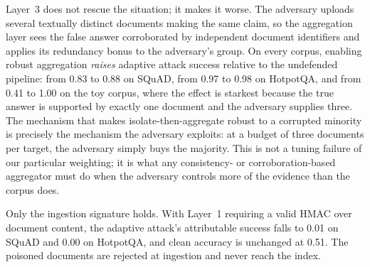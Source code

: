 \documentclass[information,article,submit,moreauthors]{Definitions/mdpi}
\newcommand{\casrAdaptiveHotpotqanone}{0.97}
\newcommand{\casrAdaptiveHotpotqaLThree}{0.98}
\newcommand{\casrAdaptiveHotpotqafullsigned}{0.00}
\newcommand{\casrAdaptiveToynone}{0.41}
\newcommand{\casrAdaptiveToyLThree}{1.00}
\newcommand{\casrAdaptiveSquadnone}{0.83}
\newcommand{\casrAdaptiveSquadLThree}{0.88}
\newcommand{\casrAdaptiveSquadfullsigned}{0.01}
\newcommand{\cleanAccSquadfullsigned}{0.51}
\begin{document}
Layer~3 does not rescue the situation; it makes it worse. The adversary uploads several
textually distinct documents making the same claim, so the aggregation layer sees the false
answer corroborated by independent document identifiers and applies its redundancy bonus to the
adversary's group. On every corpus, enabling robust aggregation \emph{raises} adaptive attack
success relative to the undefended pipeline: from \casrAdaptiveSquadnone{} to
\casrAdaptiveSquadLThree{} on SQuAD, from \casrAdaptiveHotpotqanone{} to \casrAdaptiveHotpotqaLThree{}
on HotpotQA, and from \casrAdaptiveToynone{} to \casrAdaptiveToyLThree{} on the toy corpus, where
the effect is starkest because the true answer is supported by exactly one document and the
adversary supplies three. The mechanism that makes isolate-then-aggregate robust to a corrupted
minority is precisely the mechanism the adversary exploits: at a budget of three documents per
target, the adversary simply buys the majority. This is not a tuning failure of our particular
weighting; it is what any consistency- or corroboration-based aggregator must do when the
adversary controls more of the evidence than the corpus does.

Only the ingestion signature holds. With Layer~1 requiring a valid HMAC over document content,
the adaptive attack's attributable success falls to \casrAdaptiveSquadfullsigned{} on SQuAD and
\casrAdaptiveHotpotqafullsigned{} on HotpotQA, and clean accuracy is unchanged at
\cleanAccSquadfullsigned{}. The poisoned documents are rejected at ingestion and never reach
the index.
\end{document}
